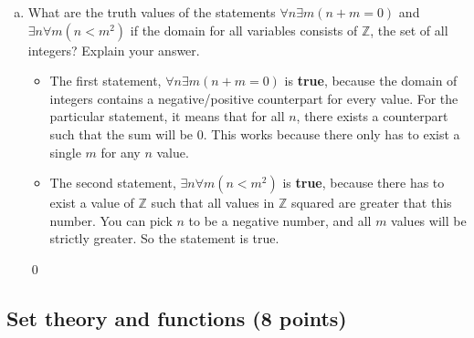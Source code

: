 \documentclass[12pt]{article}
\newcommand{\Z}{\mathbb{Z}}
\begin{document}
\begin{enumerate}[a)]
\medskip

\item What are the truth values of the statements
  $\forall n\exists m(n+m=0)$ and $\exists n\forall m(n<m^2)$ if the
  domain for all variables consists of $\Z$, the set of all integers?
  Explain your answer.

  \begin{itemize}
  \item The first statement, $\forall n\exists m(n+m=0)$ is \textbf{true}, because the domain of integers contains a negative/positive counterpart for every value. For the particular statement, it means that for all $n$, there exists a counterpart such that the sum will be 0.
    This works because there only has to exist a single $m$ for any $n$ value.
  \item The second statement, $\exists n\forall m(n<m^2)$ is \textbf{true}, because there has to exist a value of $\Z$ such that all values in $\Z$ squared are greater that this number. You can pick $n$ to be a negative number, and all $m$ values will be strictly greater. So the statement is true.  
  \end{itemize}
  \qed
\end{enumerate}

\bigskip

\subsection{Set theory and functions (8 points)}
\label{sec:set-theory-functions}

\def\firstcircle{(0,0) circle (1.5cm)}
\def\secondcircle{(45:2cm) circle (1.5cm)}
\def\thirdcircle{(0:2cm) circle (1.5cm)}

\end{document}

